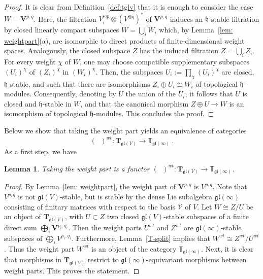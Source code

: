 \documentclass[12pt,reqno]{amsart}
\newtheorem{lem}[thm]{Lemma}
\theoremstyle{definition}
\theoremstyle{remark}
\begin{document}
	\begin{proof}	    
	    It is clear from Definition~\ref{def:tglv} that it is enough to consider the case $W = \mathbf{V}^{p,q}$. Here, the filtration $V_i ^{\otimes p}\otimes (V^{\otimes q})^*$ of $\mathbf{V}^{p,q}$ induces an $\mathfrak{h}$-stable filtration by closed linearly compact subspaces 
	    $W = \bigcup_i W_i$ which, by Lemma~\ref{lem: weightpart}(a), are isomorphic to direct products of finite-dimensional weight spaces. Analogously, the closed subspace $Z$ has the induced filtration $Z = \bigcup_i Z_i$.  For every weight $\chi$ of $W$, one may choose compatible supplementary subspaces $(U_i)^\chi$ of $(Z_i)^\chi$ in $(W_i)^\chi$. Then, the subspaces $U_i := \prod_\chi (U_i)^\chi$ are closed, $\mathfrak{h}$-stable, and such that there are isomorphisms $Z_i \oplus U_i \cong W_i$ of topological $\mathfrak{h}$-modules. Consequently, denoting by $U$ the union of the $U_i$, it follows that $U$ is closed and $\mathfrak{h}$-stable in $W$, and that the canonical morphism $Z\oplus U \rightarrow W$ is an isomorphism of topological $\mathfrak{h}$-modules. This concludes the proof.
	\end{proof}
	
	
	
	
	

	
	Below we show that taking the weight part yields an equivalence of categories  
	$$(\phantom{a})^{wt}: \mathbf{T}_{\mathfrak{gl}(V)} \rightarrow \mathbb{T}_{\mathfrak{gl}(\infty)}\ . $$
	As a first step, we have
	
	\begin{lem}
	    Taking the weight part is a functor  $(\phantom{a})^{wt}: \mathbf{T}_{\mathfrak{gl}(V)} \rightarrow \mathbb{T}_{\mathfrak{gl}(\infty)}$.
	\end{lem}
	\begin{proof}
	    By Lemma~\ref{lem: weightpart}, the weight part of $\mathbf{V}^{p,q}$ is $V^{p,q}$. Note that $V^{p,q}$ is not $\mathfrak{gl}(V)$-stable, but is stable by the dense Lie subalgebra $\mathfrak{gl}(\infty)$ consisting of finitary matrices with respect to the basis $\mathcal{V}$ of $V$. Let $W\cong Z/U$ be an object of $\mathbf{T}_{\mathfrak{gl}(V)}$, with $U\subset Z$ two closed $\mathfrak{gl}(V)$-stable subspaces of a finite direct sum  $\bigoplus_i \mathbf{V}^{p_i,q_i}$. Then the weight parts $U^{wt}$ and $Z^{wt}$ are $\mathfrak{gl}(\infty)$-stable subspaces of $\bigoplus_i V^{p_i,q_i}$. Furthermore, Lemma~\ref{T-split} implies that $W^{wt} \cong Z^{wt}/U^{wt}$. Thus the weight part $W^{wt}$ is an object of the category $\mathbb{T}_{\mathfrak{gl}(\infty)}$. Next, it is clear that morphisms in $\mathbf{T}_{\mathfrak{gl}(V)}$ restrict to $\mathfrak{gl}(\infty)$-equivariant morphisms between weight parts. This proves the statement.
	\end{proof}
	
\end{document}

